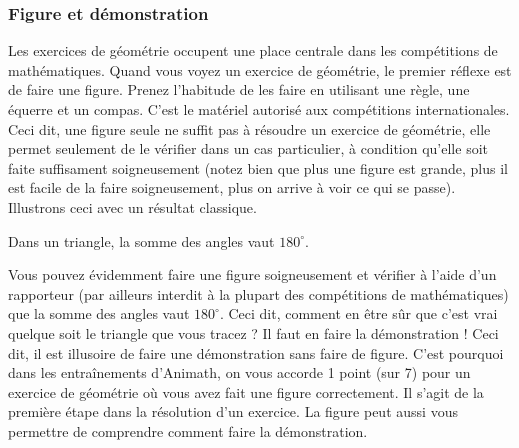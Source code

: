 \subsubsection{Figure et démonstration}

Les exercices de géométrie occupent une place centrale dans les compétitions de mathématiques. Quand vous voyez un exercice de géométrie, le premier réflexe est de faire une figure. Prenez l'habitude de les faire en utilisant une règle, une équerre et un compas. C'est le matériel autorisé aux compétitions internationales. Ceci dit, une figure seule ne suffit pas à résoudre un exercice de géométrie, elle permet seulement de le vérifier dans un cas particulier, à condition qu'elle soit faite suffisament soigneusement (notez bien que plus une figure est grande, plus il est facile de la faire soigneusement, plus on arrive à voir ce qui se passe). Illustrons ceci avec un résultat classique.

\begin{thm}
Dans un triangle, la somme des angles vaut $180^\circ$.
\end{thm}

Vous pouvez évidemment faire une figure soigneusement et vérifier à l'aide d'un rapporteur (par ailleurs interdit à la plupart des compétitions de mathématiques) que la somme des angles vaut $180^\circ$. Ceci dit, comment en être sûr que c'est vrai quelque soit le triangle que vous tracez ? Il faut en faire la démonstration ! Ceci dit, il est illusoire de faire une démonstration sans faire de figure. C'est pourquoi dans les entraînements d'Animath, on vous accorde 1 point (sur 7) pour un exercice de géométrie où vous avez fait une figure correctement. Il s'agit de la première étape dans la résolution d'un exercice. La figure peut aussi vous permettre de comprendre comment faire la démonstration.

